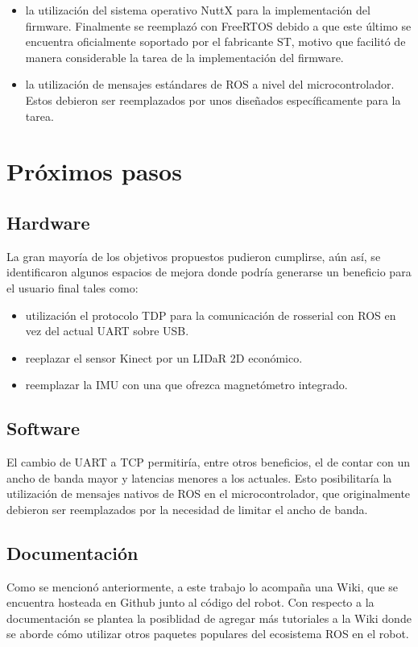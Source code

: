 \begin{itemize}
    \item la utilización del sistema operativo NuttX para la implementación del firmware. Finalmente se reemplazó con FreeRTOS debido a que este último se encuentra oficialmente soportado por el fabricante ST, motivo que facilitó de manera considerable la tarea de la implementación del firmware.
    \item la utilización de mensajes estándares de ROS a nivel del microcontrolador. Estos debieron ser reemplazados por unos diseñados específicamente para la tarea.
\end{itemize}

\section{Próximos pasos}

\subsection{Hardware}

La gran mayoría de los objetivos propuestos pudieron cumplirse, aún así, se identificaron algunos espacios de mejora donde podría generarse un beneficio para el usuario final tales como:

\begin{itemize}
    \item utilización el protocolo TDP para la comunicación de rosserial con ROS en vez del actual UART sobre USB.
    \item reeplazar el sensor Kinect por un LIDaR 2D económico.
    \item reemplazar la IMU con una que ofrezca magnetómetro integrado.
\end{itemize}

\subsection{Software}

El cambio de UART a TCP permitiría, entre otros beneficios, el de contar con un ancho de banda mayor y latencias menores a los actuales. Esto posibilitaría la utilización de mensajes nativos de ROS en el microcontrolador, que originalmente debieron ser reemplazados por la necesidad de limitar el ancho de banda.

\subsection{Documentación}

Como se mencionó anteriormente, a este trabajo lo acompaña una Wiki, que se encuentra hosteada en Github junto al código del robot. Con respecto a la documentación se plantea la posiblidad de agregar más tutoriales a la Wiki donde se aborde cómo utilizar otros paquetes populares del ecosistema ROS en el robot.